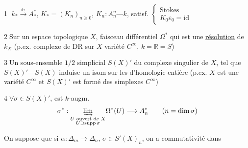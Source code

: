 
\textcircled{1}\quad
$k_*\xrightarrow{\varepsilon_*}A_*^*$,
$K_*=(K_n)_{n\geq0}$,
$K_n:A_n^n\text{---}k$, satisf.
$\left\{\begin{array}{l}\text{Stokes}\\ K_0\varepsilon_0=\mathrm{id}\end{array}\right.$

\textcircled{2}\quad Sur un  espace topologique $X$,
faisceau différentiel 
 $\Omega^*$ qui est une \uline{résolution} de $k_X$
(p.ex. complexe de DR sur $X$ variété $C^\infty$, $k=\mathbb R=S$)

\textcircled{3}\quad Un sous-ensemble $1/2$ simplicial $S(X)'$ du complexe singulier de $X$, tel que
$S(X)'\text{---}S(X)$  induise un isom sur les  d'homologie entière
(p.ex. $X$ est une variété $C^\infty$ et $S(X)'$ est formé des simplexes $C^\infty$)


\textcircled{4}\quad $\forall\sigma\in S(X)'$, est
 $k$-augm.
\[
\sigma^*:\underset{\substack{U\text{ ouvert de }X\\ U\supset\operatorname{supp}\sigma}}{\varinjlim}
\Omega^*(U)\longrightarrow A_n^*
\qquad(n=\dim\sigma)
\]

On suppose que si $\alpha:\Delta_m\longrightarrow\Delta_n$,
$\sigma\in S'(X)_n$,
on a commutativité dans

